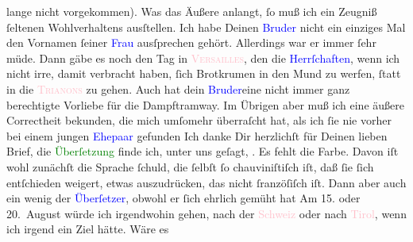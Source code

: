                lange nicht vorgekommen).\pend
           \pstart
           Was das Äußere anlangt, ſo muß ich ein Zeugniß ſeltenen Wohlverhaltens ausſtellen.
               Ich habe Deinen \textcolor{blue}{Bruder}{} nicht
               ein einziges Mal den Vornamen ſeiner \textcolor{blue}{Frau}{} ausſprechen gehört. Allerdings war er immer ſehr müde. Dann gäbe es
               noch den Tag in \textsc{\textcolor{pink}{Versailles}{}\ledrightnote{\textcolor{pink}{Versailles}}}, den die \textcolor{blue}{Herrſchaften}{}, wenn ich nicht irre, damit verbracht haben,
               ſich Brotkrumen in den Mund zu werfen, ſtatt in die \textsc{\textcolor{pink}{Trianons}{}\ledrightnote{\textcolor{pink}{Petit Trianon}{\newline}\textcolor{pink}{Grand Trianon}}} zu gehen. Auch hat dein \textcolor{blue}{Bruder}{}eine nicht immer ganz berechtigte Vorliebe für die
               Dampftramway. Im Übrigen aber muß ich \strikeout{\textcolor{gray}{von}} eine\strikeout{\textcolor{gray}{r}} äußere\strikeout{\textcolor{gray}{n}} Correctheit bekunden, die mich umſomehr überraſcht
               hat, als ich ſie nie vorher bei einem jungen \textcolor{blue}{Ehepaar}{} gefunden{\dotsfive}\pend
           \pstart
           Ich danke Dir herzlichſt für Deinen lieben Brief, die \textcolor{green}{Überſetzung}{} finde ich, unter uns
               geſagt, \label{K_L02608-2v}\label{K_L02608-2h}. Es fehlt die Farbe. Davon iſt wohl zunächſt die
               Sprache ſchuld, die ſelbſt ſo chauviniſtiſch iſt, daß ſie ſich entſchieden weigert,
               etwas auszudrücken, das nicht ſranzöſiſch iſt. Dann aber auch ein wenig {\pb}der \textcolor{blue}{Überſetzer}{}, obwohl er ſich ehrlich gemüht hat{\dotsfive}\pend
           \pstart
           Am 15. oder 20. August würde ich
               irgendwohin gehen, nach der \textcolor{pink}{Schweiz}{}\ledrightnote{\textcolor{pink}{Schweiz}} oder nach \textcolor{pink}{Tirol}{}\ledrightnote{\textcolor{pink}{Tirol}{\newline}\textcolor{pink}{Südtirol}}, wenn ich irgend ein Ziel hätte. Wäre es
